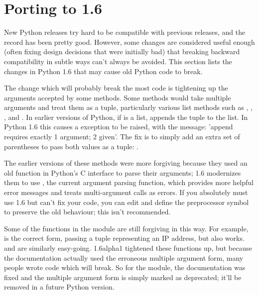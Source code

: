 \documentclass{howto}
\begin{document}
\section{Porting to 1.6}

New Python releases try hard to be compatible with previous releases,
and the record has been pretty good.  However, some changes are
considered useful enough (often fixing design decisions that were
initially bad) that breaking backward compatibility in subtle ways
can't always be avoided.  This section lists the changes in Python 1.6
that may cause old Python code to break.

The change which will probably break the most code is tightening up
the arguments accepted by some methods.  Some methods would take
multiple arguments and treat them as a tuple, particularly various
list methods such as , ,
, and .
%
%
In earlier versions of Python, if  is a list,  appends the tuple  to the list.  In Python 1.6 this
causes a  exception to be raised, with the
message: 'append requires exactly 1 argument; 2 given'.  The fix is to
simply add an extra set of parentheses to pass both values as a tuple: 
.

The earlier versions of these methods were more forgiving because they
used an old function in Python's C interface to parse their arguments;
1.6 modernizes them to use , the current
argument parsing function, which provides more helpful error messages
and treats multi-argument calls as errors.  If you absolutely must use
1.6 but can't fix your code, you can edit 
and define the preprocessor symbol  to
preserve the old behaviour; this isn't recommended.

Some of the functions in the  module are still
forgiving in this way.  For example,  is the correct form, passing a tuple representing
an IP address, but
 also
works.  and  are
similarly easy-going.  1.6alpha1 tightened these functions up, but
because the documentation actually used the erroneous multiple
argument form, many people wrote code which will break.  So for
the module, the documentation was fixed and the
multiple argument form is simply marked as deprecated; it'll be
removed in a future Python version.  
\end{document}
